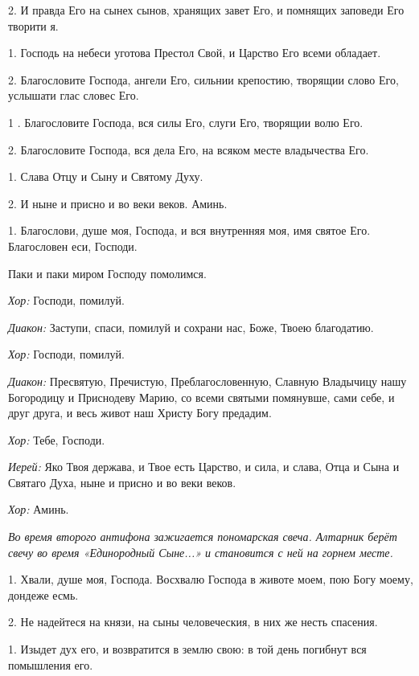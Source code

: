  2. И правда Его на сынех сынов, хранящих завет Его, и помнящих заповеди Его творити я. 

 1. Господь на небеси уготова Престол Свой, и Царство Его всеми обладает. 

 2. Благословите Господа, ангели Его,  сильнии крепостию, творящии слово Его, услышати глас словес Его. 

 1 . Благословите Господа, вся силы Его, слуги Его, творящии волю Его. 

 2. Благословите Господа, вся дела Его, на всяком месте владычества Его. 

 1. Слава Отцу и Сыну и Святому Духу. 

 2. И ныне и присно и во веки веков. Аминь. 

 1. Благослови, душе моя, Господа, и вся внутренняя моя, имя святое Его. Благословен еси, Господи. 


 Паки и паки миром Господу помолимся. 

 {\itshape Хор:} Господи, помилуй. 

 {\itshape Диакон:} Заступи, спаси, помилуй и сохрани нас, Боже, Твоею благодатию. 

 {\itshape Хор:} Господи, помилуй. 

 {\itshape Диакон:} Пресвятую, Пречистую, Преблагословенную, Славную Владычицу нашу Богородицу и Приснодеву Марию, со всеми святыми помянувше, сами себе, и друг друга, и весь живот наш Христу Богу предадим. 

 {\itshape Хор:} Тебе, Господи. 

 {\itshape Иерей:} Яко Твоя держава, и Твое есть Царство, и сила, и слава, Отца и Сына и Святаго Духа, ныне и присно и во веки веков. 

 {\itshape Хор:} Аминь. 

 {\itshape Во время второго антифона зажигается пономарская свеча. Алтарник берёт свечу во время «Единородный Сыне...» и становится с ней на горнем месте.} 


 1. Хвали, душе моя, Господа. Восхвалю Господа в животе моем, пою Богу моему, дондеже есмь. 

 2. Не надейтеся на князи, на сыны человеческия, в них же несть спасения. 

 1. Изыдет дух его, и возвратится в землю свою: в той день погибнут вся помышления его. 

